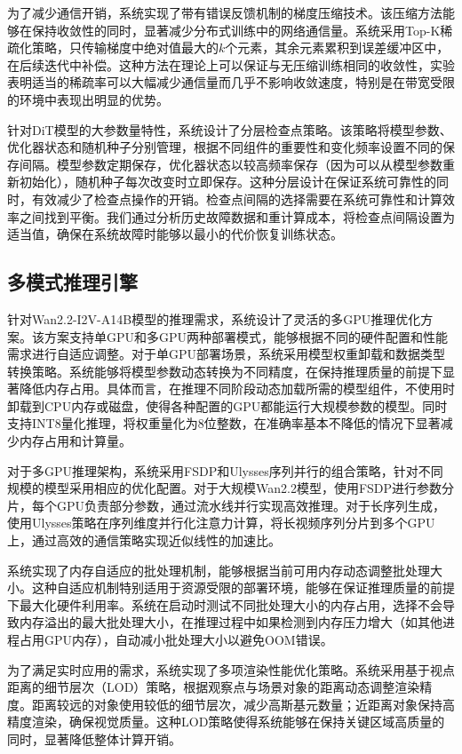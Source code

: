 为了减少通信开销，系统实现了带有错误反馈机制的梯度压缩技术。该压缩方法能够在保持收敛性的同时，显著减少分布式训练中的网络通信量。系统采用Top-K稀疏化策略，只传输梯度中绝对值最大的$k$个元素，其余元素累积到误差缓冲区中，在后续迭代中补偿。这种方法在理论上可以保证与无压缩训练相同的收敛性，实验表明适当的稀疏率可以大幅减少通信量而几乎不影响收敛速度，特别是在带宽受限的环境中表现出明显的优势。

针对DiT模型的大参数量特性，系统设计了分层检查点策略。该策略将模型参数、优化器状态和随机种子分别管理，根据不同组件的重要性和变化频率设置不同的保存间隔。模型参数定期保存，优化器状态以较高频率保存（因为可以从模型参数重新初始化），随机种子每次改变时立即保存。这种分层设计在保证系统可靠性的同时，有效减少了检查点操作的开销。检查点间隔的选择需要在系统可靠性和计算效率之间找到平衡。我们通过分析历史故障数据和重计算成本，将检查点间隔设置为适当值，确保在系统故障时能够以最小的代价恢复训练状态。

\subsection{多模式推理引擎}

针对Wan2.2-I2V-A14B模型的推理需求，系统设计了灵活的多GPU推理优化方案。该方案支持单GPU和多GPU两种部署模式，能够根据不同的硬件配置和性能需求进行自适应调整。对于单GPU部署场景，系统采用模型权重卸载和数据类型转换策略。系统能够将模型参数动态转换为不同精度，在保持推理质量的前提下显著降低内存占用。具体而言，在推理不同阶段动态加载所需的模型组件，不使用时卸载到CPU内存或磁盘，使得各种配置的GPU都能运行大规模参数的模型。同时支持INT8量化推理，将权重量化为8位整数，在准确率基本不降低的情况下显著减少内存占用和计算量。

对于多GPU推理架构，系统采用FSDP和Ulysses序列并行的组合策略，针对不同规模的模型采用相应的优化配置。对于大规模Wan2.2模型，使用FSDP进行参数分片，每个GPU负责部分参数，通过流水线并行实现高效推理。对于长序列生成，使用Ulysses策略在序列维度并行化注意力计算，将长视频序列分片到多个GPU上，通过高效的通信策略实现近似线性的加速比。

系统实现了内存自适应的批处理机制，能够根据当前可用内存动态调整批处理大小。这种自适应机制特别适用于资源受限的部署环境，能够在保证推理质量的前提下最大化硬件利用率。系统在启动时测试不同批处理大小的内存占用，选择不会导致内存溢出的最大批处理大小，在推理过程中如果检测到内存压力增大（如其他进程占用GPU内存），自动减小批处理大小以避免OOM错误。

为了满足实时应用的需求，系统实现了多项渲染性能优化策略。系统采用基于视点距离的细节层次（LOD）策略，根据观察点与场景对象的距离动态调整渲染精度。距离较远的对象使用较低的细节层次，减少高斯基元数量；近距离对象保持高精度渲染，确保视觉质量。这种LOD策略使得系统能够在保持关键区域高质量的同时，显著降低整体计算开销。

